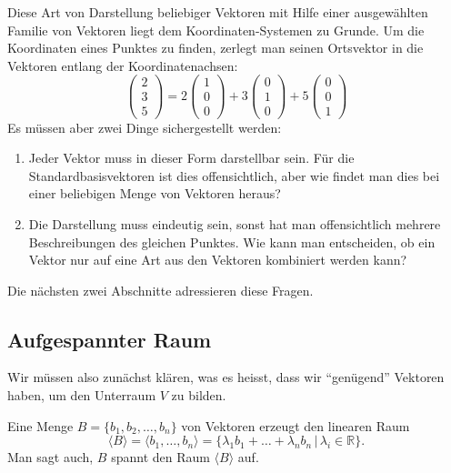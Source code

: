 Diese Art von Darstellung beliebiger Vektoren mit Hilfe einer
ausgewählten Familie von Vektoren liegt dem Koordinaten-Systemen
zu Grunde.
Um die Koordinaten eines Punktes zu finden, zerlegt
man seinen Ortsvektor in die Vektoren entlang der Koordinatenachsen:
\[
\begin{pmatrix}2\\3\\5\end{pmatrix}
=
2\begin{pmatrix}1\\0\\0\end{pmatrix}+
3\begin{pmatrix}0\\1\\0\end{pmatrix}+
5\begin{pmatrix}0\\0\\1\end{pmatrix}
\]
Es müssen aber zwei Dinge sichergestellt werden:
\begin{enumerate}
\item Jeder Vektor muss in dieser Form darstellbar sein.
Für die
Standardbasisvektoren ist dies offensichtlich, aber wie findet man
dies bei einer beliebigen Menge von Vektoren heraus?
\item Die Darstellung muss eindeutig sein, sonst hat man offensichtlich
mehrere Beschreibungen des gleichen Punktes.
Wie kann man entscheiden,
ob ein Vektor nur auf eine Art aus den Vektoren kombiniert werden kann?
\end{enumerate}
Die nächsten zwei Abschnitte adressieren diese Fragen.

\subsection{Aufgespannter Raum}
Wir müssen also zunächst klären, was es heisst, dass wir ``genügend''
Vektoren haben, um den Unterraum $V$ zu bilden.

\begin{definition}
Eine Menge $B=\{b_1,b_2,\dots,b_n\}$ von Vektoren erzeugt den
linearen Raum
\[
\langle B\rangle =
\langle b_1,\dots , b_n\rangle =
\{\lambda_1b_1+\dots+\lambda_nb_n\,|\,\lambda_i\in\mathbb R\}.
\]
Man sagt auch, $B$ spannt den Raum $\langle B\rangle$ auf.
\end{definition}

